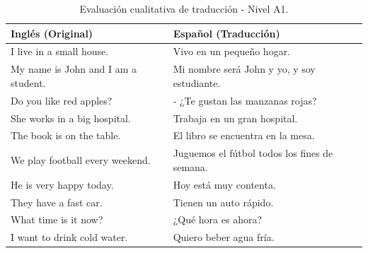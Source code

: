 \begin{table}[t!]
    \centering
    \begin{tabular}{p{} p{}}
        \toprule
        \textbf{Inglés (Original)} & \textbf{Español (Traducción)} \\
        \midrule
        I live in a small house. & Vivo en un pequeño hogar. \\
        My name is John and I am a student. & Mi nombre será John y yo, y soy estudiante. \\
        Do you like red apples? & - ¿Te gustan las manzanas rojas? \\
        She works in a big hospital. & Trabaja en un gran hospital. \\
        The book is on the table. & El libro se encuentra en la mesa. \\
        We play football every weekend. & Juguemos el fútbol todos los fines de semana. \\
        He is very happy today. & Hoy está muy contenta. \\
        They have a fast car. & Tienen un auto rápido. \\
        What time is it now? & ¿Qué hora es ahora? \\
        I want to drink cold water. & Quiero beber agua fría. \\
        \bottomrule
    \end{tabular}
    \caption{Evaluación cualitativa de traducción - Nivel A1.}
    \label{tab:evaluacion_A1}
\end{table}

